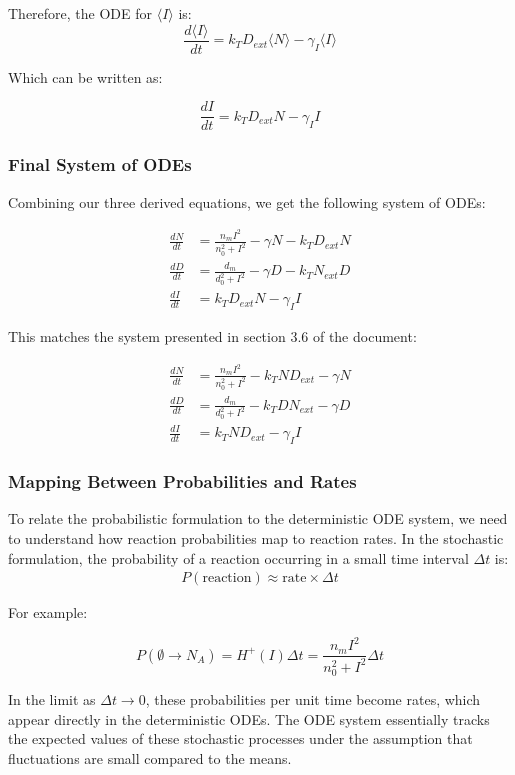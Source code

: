\documentclass{article}
\begin{document}
\begin{flushleft}
Therefore, the ODE for $\langle I \rangle$ is:
\[
\frac{d\langle I \rangle}{dt} = k_T D_{ext} \langle N \rangle - \gamma_I \langle I \rangle
\]

Which can be written as:

\[
\frac{dI}{dt} = k_T D_{ext} N - \gamma_I I
\]

\subsubsection{Final System of ODEs}

Combining our three derived equations, we get the following system of ODEs:

\begin{align*}
\frac{dN}{dt} &= \frac{n_m I^2}{n_0^2 + I^2} - \gamma N - k_T D_{ext} N \\
\frac{dD}{dt} &= \frac{d_m}{d_0^2 + I^2} - \gamma D - k_T N_{ext} D \\
\frac{dI}{dt} &= k_T D_{ext} N - \gamma_I I
\end{align*}

This matches the system presented in section 3.6 of the document:

\begin{align*}
\frac{dN}{dt} &= \frac{n_m I^2}{n_0^2 + I^2} - k_T N D_{ext} - \gamma N \\
\frac{dD}{dt} &= \frac{d_m}{d_0^2 + I^2} - k_T D N_{ext} - \gamma D \\
\frac{dI}{dt} &= k_T N D_{ext} - \gamma_I I
\end{align*}

\subsubsection{Mapping Between Probabilities and Rates}

To relate the probabilistic formulation to the deterministic ODE system, we need to understand how reaction probabilities map to reaction rates. In the stochastic formulation, the probability of a reaction occurring in a small time interval $\Delta t$ is:
\begin{align*}
P(\text{reaction}) \approx \text{rate} \times \Delta t
\end{align*}

For example:

\[
P(\emptyset \rightarrow N_A) = H^+(I) \Delta t = \frac{n_m I^2}{n_0^2 + I^2} \Delta t 
\]

In the limit as $\Delta t \rightarrow 0$, these probabilities per unit time become rates, which appear directly in the deterministic ODEs. The ODE system essentially tracks the expected values of these stochastic processes under the assumption that fluctuations are small compared to the means.


\end{flushleft}
\end{document}
